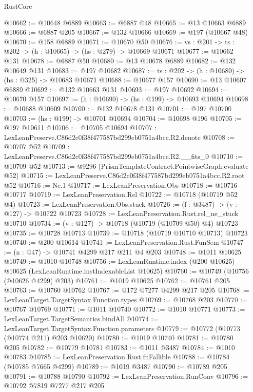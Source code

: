 \begin{lexlean}{RustCore}
\begin{coremodule}
@10662 := @10648 @6889
@10663 := @6887 @48
@10665 := @13 @10663 @6889
@10666 := @6887 @205
@10667 := @132 @10666
@10669 := @197 (@10667 @48)
@10670 := @158 @6889
@10671 := @10670 @50
@10676 := {vs : @201} -> {ts : @202} -> (h : @10665) -> (hs : @279) -> @10669 @10671
@10677 := @10662 @131
@10678 := @6887 @50
@10680 := @13 @10678 @6889
@10682 := @132 @10649 @131
@10683 := @197 @10682
@10687 := {ts : @202} -> (h : @10680) -> (hs : @325) -> @10683 @10671
@10688 := @10677 @157
@10690 := @13 @10607 @6889
@10692 := @132 @10663 @131
@10693 := @197 @10692
@10694 := @10670 @157
@10697 := (h : @10690) -> (hs : @199) -> @10693 @10694
@10698 := @10688 @10609
@10700 := @132 @10678 @131
@10701 := @197 @10700
@10703 := (hs : @199) -> @10701 @10694
@10704 := @10698 @196
@10705 := @197 @10611
@10706 := @10705 @10694
@10707 := LexLeanPreserve.C86d2c0f38f477587bd299eb0751a4bcc.R2.denote
@10708 := @10707 @52
@10709 := LexLeanPreserve.C86d2c0f38f477587bd299eb0751a4bcc.R2.__fits_0
@10710 := @10709 @52
@10713 := @9296 (PrismTemplateContract.PointwiseGraph.evaluate @52)
@10715 := LexLeanPreserve.C86d2c0f38f477587bd299eb0751a4bcc.R2.root @52
@10716 := Ne.{1}
@10717 := LexLeanPreservation.Obs
@10718 := @10716 @10717
@10719 := LexLeanPreservation.Rel
@10722 := @10718 (@10719 @52 @4)
@10723 := LexLeanPreservation.Obs.stuck
@10726 := (f : @3487) -> (v : @127) -> @10722 @10723
@10728 := LexLeanPreservation.Rust.rel_ne_stuck @10710
@10734 := (v : @127) -> @10718 (@10719 (@10709 @50) @4) @10723
@10735 := @10728 @10713
@10739 := @10718 (@10719 @10710 @10713) @10723
@10740 := @200 @10614
@10741 := LexLeanPreservation.Rust.FunSem
@10747 := (n : @47) -> @10741 @4299 @217 @211 @4 @203
@10748 := @1011 @10625
@10749 := @1010 @10748
@10756 := LexLeanRuntime.index (@200 @10625) @10625 (LexLeanRuntime.instIndexableList @10625)
@10760 := @10749 (@10756 (@10626 @4299) @203)
@10761 := @1019 @10625
@10762 := @10761 @205
@10763 := @10760 @10762
@10767 := @172 @7277 @4299 @217 @205
@10768 := LexLeanTarget.TargetSyntax.Function.types
@10769 := @10768 @203
@10770 := @10767 @10769
@10771 := @1011 @10740
@10772 := @1010 @10771
@10773 := LexLeanTarget.TargetSemantics.bindAll
@10774 := LexLeanTarget.TargetSyntax.Function.parameters
@10779 := @10772 (@10773 (@10774 @211) @203 @10620)
@10780 := @1019 @10740
@10781 := @10780 @205
@10782 := @10779 @10781
@10783 := @1011 @3487
@10784 := @1010 @10783
@10785 := LexLeanPreservation.Rust.fnFallible
@10788 := @10784 (@10785 @7665 @4299)
@10789 := @1019 @3487
@10790 := @10789 @205
@10791 := @10788 @10790
@10792 := LexLeanPreservation.RunConv
@10796 := @10792 @7819 @7277 @217 @205

\end{coremodule}
\end{lexlean}
